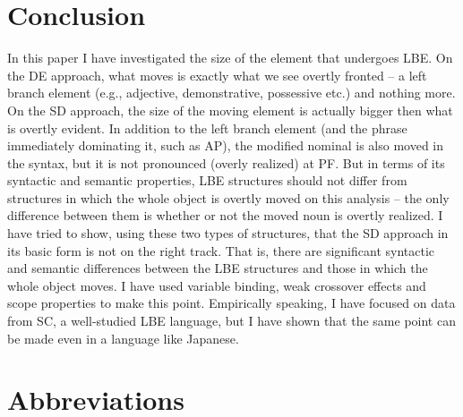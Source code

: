 \documentclass[output=paper]{langscibook}
\begin{document}
\begin{exe}
\ex \label{35de}
\begin{xlist}

\end{xlist}
\end{exe}

\section{Conclusion} \label{s4de}
In this paper I have investigated the size of the element that undergoes LBE. On the DE approach, what moves is exactly what we see overtly fronted – a left branch element (e.g., adjective, demonstrative, possessive etc.) and nothing more. On the SD approach, the size of the moving element is actually bigger then what is overtly evident. In addition to the left branch element (and the phrase immediately dominating it, such as AP), the modified nominal is also moved in the syntax, but it is not pronounced (overly realized) at PF. But in terms of its syntactic and semantic properties, LBE structures should not differ from structures in which the whole object is overtly moved on this analysis – the only difference between them is whether or not the moved noun is overtly realized. I have tried to show, using these two types of structures, that the SD approach in its basic form is not on the right track. That is, there are significant syntactic and semantic differences between the LBE structures and those in which the whole object moves.  I have used variable binding, weak crossover effects and scope properties to make this point. Empirically speaking, I have focused on data from SC, a well-studied LBE language, but I have shown that the same point can be made even in a language like Japanese. 

\section*{Abbreviations}
\end{document}
